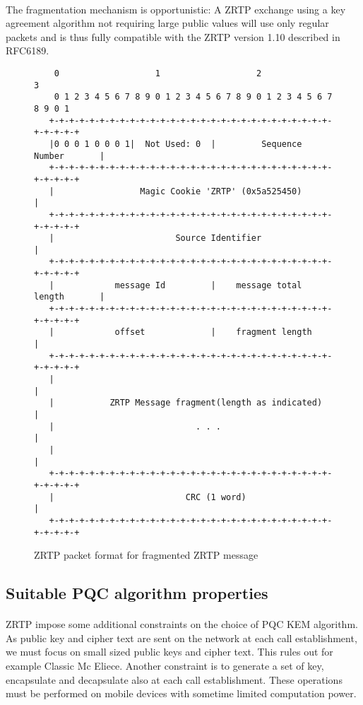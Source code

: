 \documentclass[a4paper,11pt]{article}
\begin{document}
\paragraph*{}The fragmentation mechanism is opportunistic: A ZRTP exchange using a key agreement algorithm not requiring large public values will use only regular packets and is thus fully compatible with the ZRTP version 1.10 described in RFC6189.
\begin{figure}
  \begin{verbatim}
    0                   1                   2                   3
    0 1 2 3 4 5 6 7 8 9 0 1 2 3 4 5 6 7 8 9 0 1 2 3 4 5 6 7 8 9 0 1
   +-+-+-+-+-+-+-+-+-+-+-+-+-+-+-+-+-+-+-+-+-+-+-+-+-+-+-+-+-+-+-+-+
   |0 0 0 1 0 0 0 1|  Not Used: 0  |         Sequence Number       |
   +-+-+-+-+-+-+-+-+-+-+-+-+-+-+-+-+-+-+-+-+-+-+-+-+-+-+-+-+-+-+-+-+
   |                 Magic Cookie 'ZRTP' (0x5a525450)              |
   +-+-+-+-+-+-+-+-+-+-+-+-+-+-+-+-+-+-+-+-+-+-+-+-+-+-+-+-+-+-+-+-+
   |                        Source Identifier                      |
   +-+-+-+-+-+-+-+-+-+-+-+-+-+-+-+-+-+-+-+-+-+-+-+-+-+-+-+-+-+-+-+-+
   |            message Id         |    message total length       |
   +-+-+-+-+-+-+-+-+-+-+-+-+-+-+-+-+-+-+-+-+-+-+-+-+-+-+-+-+-+-+-+-+
   |            offset             |    fragment length            |
   +-+-+-+-+-+-+-+-+-+-+-+-+-+-+-+-+-+-+-+-+-+-+-+-+-+-+-+-+-+-+-+-+
   |                                                               |
   |           ZRTP Message fragment(length as indicated)          |
   |                            . . .                              |
   |                                                               |
   +-+-+-+-+-+-+-+-+-+-+-+-+-+-+-+-+-+-+-+-+-+-+-+-+-+-+-+-+-+-+-+-+
   |                          CRC (1 word)                         |
   +-+-+-+-+-+-+-+-+-+-+-+-+-+-+-+-+-+-+-+-+-+-+-+-+-+-+-+-+-+-+-+-+
   \end{verbatim}
  \caption{ZRTP packet format for fragmented ZRTP message}
  \label{fig:fragmentedZRTPpacket}
\end{figure}
\FloatBarrier

  

\subsection{Suitable PQC algorithm properties}
\label{subsec:zrtpRequirements}
\paragraph*{}ZRTP impose some additional constraints on the choice of PQC KEM algorithm. As public key and cipher text are sent on the network at each call establishment, we must focus on small sized public keys and cipher text. This rules out for example Classic Mc Eliece. Another constraint is to generate a set of key, encapsulate and decapsulate also at each call establishment. These operations must be performed on mobile devices with sometime limited computation power.
\end{document}
